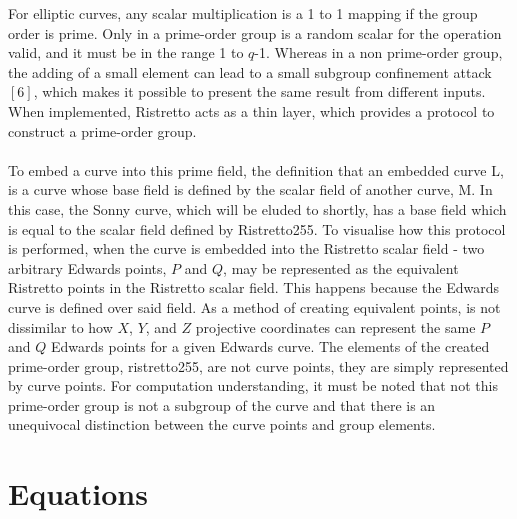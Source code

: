 \documentclass{article}
\begin{document}
For elliptic curves, any scalar multiplication is a 1 to 1 mapping if the group order is prime. Only in a prime-order group is a random scalar for the operation valid, and it must be in the range 1 to $q$-1. Whereas in a non prime-order group, the adding of a small element can lead to a small subgroup confinement attack$[6]$, which makes it possible to present the same result from different inputs. When implemented, Ristretto acts as a thin layer, which provides a protocol to construct a prime-order group.  \\\\
To embed a curve into this prime field, the definition that an embedded curve L, is a curve whose base field is defined by the scalar field of another curve, M. In this case, the Sonny curve, which will be eluded to shortly, has a base field which is equal to the scalar field defined by Ristretto255. To visualise how this protocol is performed, when the curve is embedded into the Ristretto scalar field - two arbitrary Edwards points, $P$ and $Q$, may be represented as the equivalent Ristretto points in the Ristretto scalar field. This happens because the Edwards curve is defined over said field. As a method of creating equivalent points, is not dissimilar to how $X$, $Y$, and $Z$ projective coordinates can represent the same $P$ and $Q$ Edwards points for a given Edwards curve. The elements of the created prime-order group, ristretto255, are not curve points, they are simply represented by curve points. For computation understanding, it must be noted that not this prime-order group is not a subgroup of the curve and that there is an unequivocal distinction between the curve points and group elements. 
\section{Equations}
\end{document}
